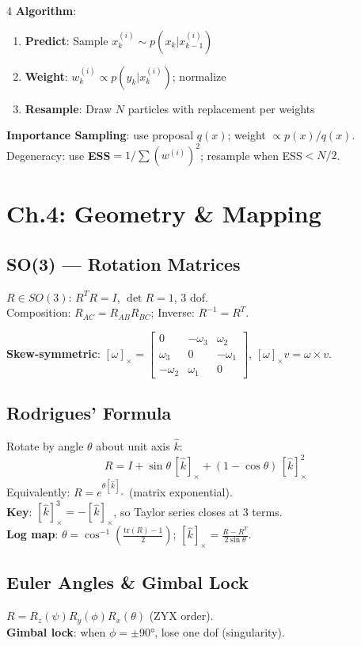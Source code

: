 \documentclass[8pt,landscape]{article}
\begin{document}
\begin{multicols}{4}
\textbf{Algorithm}:
\begin{enumerate}
  \item \textbf{Predict}: Sample $x_k^{(i)}\sim p(x_k|x_{k-1}^{(i)})$
  \item \textbf{Weight}: $w_k^{(i)}\propto p(y_k|x_k^{(i)})$; normalize
  \item \textbf{Resample}: Draw $N$ particles with replacement per weights
\end{enumerate}
\textbf{Importance Sampling}: use proposal $q(x)$; weight $\propto p(x)/q(x)$.\\
Degeneracy: use \textbf{ESS}$=1/\sum (w^{(i)})^2$; resample when ESS$<N/2$.

\section{Ch.4: Geometry \& Mapping}

\subsection{SO(3) — Rotation Matrices}
$R\in SO(3)$: $R^TR=I$, $\det R=1$, 3 dof.\\
Composition: $R_{AC}=R_{AB}R_{BC}$; Inverse: $R^{-1}=R^T$.

\textbf{Skew-symmetric}: $[\omega]_\times=\begin{bmatrix}0&-\omega_3&\omega_2\\\omega_3&0&-\omega_1\\-\omega_2&\omega_1&0\end{bmatrix}$, $[\omega]_\times v=\omega\times v$.

\subsection{Rodrigues' Formula}
Rotate by angle $\theta$ about unit axis $\hat{k}$:
\[\boxed{R=I+\sin\theta\,[\hat{k}]_\times+(1-\cos\theta)\,[\hat{k}]_\times^2}\]
Equivalently: $R=e^{\theta[\hat{k}]_\times}$ (matrix exponential).\\
\textbf{Key}: $[\hat{k}]_\times^3=-[\hat{k}]_\times$, so Taylor series closes at 3 terms.\\
\textbf{Log map}: $\theta=\cos^{-1}\!\left(\tfrac{\text{tr}(R)-1}{2}\right)$; $[\hat{k}]_\times=\frac{R-R^T}{2\sin\theta}$.

\subsection{Euler Angles \& Gimbal Lock}
$R=R_z(\psi)R_y(\phi)R_x(\theta)$ (ZYX order).\\
\textbf{Gimbal lock}: when $\phi=\pm90°$, lose one dof (singularity).


\end{multicols}
\end{document}
